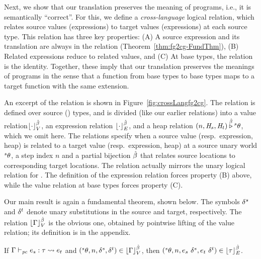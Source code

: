 Next, we show that our translation preserves the meaning of programs,
i.e., it is semantically ``correct''. For this, we define a
\emph{cross-language} logical relation, which relates source values
(expressions) to target values (expressions) at each source type. This
relation has three key properties: (A) A source expression and its
translation are always in the relation
(Theorem~\ref{thm:fg2cg-FundThm}), (B) Related expressions reduce to
related values, and (C) At base types, the relation is the
identity. Together, these imply that our translation preserves the
meanings of programs in the sense that a function from base types to
base types maps to a target function with the same extension.

An excerpt of the relation is shown in
Figure~\ref{fig:crossLangfg2cg}. The relation is defined over source
({\fg}) types, and is divided (like our earlier relations) into a
value relation$\lfloor \cdot \rfloor_{V}^{\hat{\beta}}$, an expression relation
$\lfloor \cdot \rfloor_{E}^{\hat{\beta}}$, and a heap relation $(n, \mathit{H}_s, \mathit{H}_t)
\overset{\hat{\beta}}\triangleright {^s}\theta$, which we omit here. The relations specify
when a source value (resp.\ expression, heap) is related to a target
value (resp.\ expression, heap) at a source unary world ${^s}\theta$, a
step index $n$ and a partial bijection $\hat{\beta}$ that relates source
locations to corresponding target locations. The relation actually
mirrors the unary logical relation for {\fg}. The definition of the
expression relation forces property (B) above, while the value
relation at base types forces property (C).

Our main result is again a fundamental theorem, shown below. The
symbols $\delta^s$ and $\delta^t$ denote unary substitutions in the
source and target, respectively. The relation $\lfloor \Gamma  \rfloor_{V}^{\hat{\beta}}$ is
the obvious one, obtained by pointwise lifting of the value relation;
its definition is in the appendix.


\begin{thm}\label{thm:fg2cg-FundThm}
If
  $\Gamma \vdash_{\mathit{pc}} e_s:\tau \leadsto e_t$ 
and
  $({^s}\theta, n, \delta^s, \delta^t) \in \lfloor \Gamma  \rfloor_{V}^{\hat{\beta}}$,
then
  $({^s}\theta, n, e_s ~ \delta^s, e_t ~ \delta^t) \in \lfloor \tau  \rfloor_{E}^{\hat{\beta}}$.
\end{thm}

